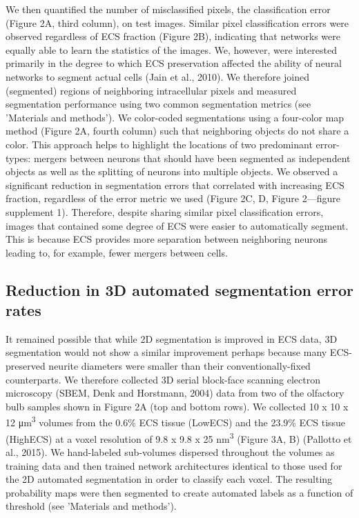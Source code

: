 \documentclass{article}
\begin{document}
We then quantified the number of misclassified pixels, the classification error (Figure 2A, third column), on test images. Similar pixel classification errors were observed regardless of ECS fraction (Figure 2B), indicating that networks were equally able to learn the statistics of the images. We, however, were interested primarily in the degree to which ECS preservation affected the ability of neural networks to segment actual cells (Jain et al., 2010). We therefore joined (segmented) regions of neighboring intracellular pixels and measured segmentation performance using two common segmentation metrics (see ’Materials and methods’). We color-coded segmentations using a four-color map method (Figure 2A, fourth column) such that neighboring objects do not share a color. This approach helps to highlight the locations of two predominant error-types: mergers between neurons that should have been segmented as independent objects as well as the splitting of neurons into multiple objects. We observed a significant reduction in segmentation errors that correlated with increasing ECS fraction, regardless of the error metric we used (Figure 2C, D, Figure 2—figure supplement 1). Therefore, despite sharing similar pixel classification errors, images that contained some degree of ECS were easier to automatically segment. This is because ECS provides more separation between neighboring neurons leading to, for example, fewer mergers between cells.

\subsection*{Reduction in 3D automated segmentation error rates}

It remained possible that while 2D segmentation is improved in ECS data, 3D segmentation would not show a similar improvement perhaps because many ECS-preserved neurite diameters were smaller than their conventionally-fixed counterparts. We therefore collected 3D serial block-face scanning electron microscopy (SBEM, Denk and Horstmann, 2004) data from two of the olfactory bulb samples shown in Figure 2A (top and bottom rows). We collected 10 x 10 x 12 μm\textsuperscript{3} volumes from the 0.6\% ECS tissue (LowECS) and the 23.9\% ECS tissue (HighECS) at a voxel resolution of 9.8 x 9.8 x 25 nm\textsuperscript{3} (Figure 3A, B) (Pallotto et al., 2015). We hand-labeled sub-volumes dispersed throughout the volumes as training data and then trained network architectures identical to those used for the 2D automated segmentation in order to classify each voxel. The resulting probability maps were then segmented to create automated labels as a function of threshold (see ’Materials and methods’).
\end{document}
